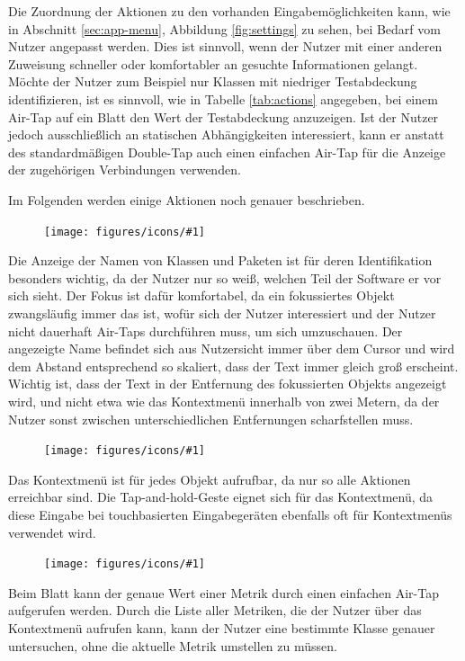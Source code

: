 Die Zuordnung der Aktionen zu den vorhanden Eingabemöglichkeiten kann, wie in Abschnitt \ref{sec:app-menu}, Abbildung \ref{fig:settings} zu sehen, bei Bedarf vom Nutzer angepasst werden. Dies ist sinnvoll, wenn der Nutzer mit einer anderen Zuweisung schneller oder komfortabler an gesuchte Informationen gelangt. Möchte der Nutzer zum Beispiel nur Klassen mit niedriger Testabdeckung identifizieren, ist es sinnvoll, wie in Tabelle \ref{tab:actions} angegeben, bei einem Air-Tap auf ein Blatt den Wert der Testabdeckung anzuzeigen. Ist der Nutzer jedoch ausschließlich an statischen Abhängigkeiten interessiert, kann er anstatt des standardmäßigen Double-Tap auch einen einfachen Air-Tap für die Anzeige der zugehörigen Verbindungen verwenden.

Im Folgenden werden einige Aktionen noch genauer beschrieben. \\

\newcommand{\inlineicon}[1]{
  \setlength\intextsep{0pt}
  \begin{figure}
    \vspace{-2px}
    \texttt{[image: figures/icons/\#1]}
  \end{figure}
}

\begingroup

\inlineicon{info}\noindent Die Anzeige der Namen von Klassen und Paketen ist für deren Identifikation besonders wichtig, da der Nutzer nur so weiß, welchen Teil der Software er vor sich sieht. Der Fokus ist dafür komfortabel, da ein fokussiertes Objekt zwangsläufig immer das ist, wofür sich der Nutzer interessiert und der Nutzer nicht dauerhaft Air-Taps durchführen muss, um sich umzuschauen. Der angezeigte Name befindet sich aus Nutzersicht immer über dem Cursor und wird dem Abstand entsprechend so skaliert, dass der Text immer gleich groß erscheint. Wichtig ist, dass der Text in der Entfernung des fokussierten Objekts angezeigt wird, und nicht etwa wie das Kontextmenü innerhalb von zwei Metern, da der Nutzer sonst zwischen unterschiedlichen Entfernungen scharfstellen muss.\\

\inlineicon{context-menu}\noindent Das Kontextmenü ist für jedes Objekt aufrufbar, da nur so alle Aktionen erreichbar sind. Die Tap-and-hold-Geste eignet sich für das Kontextmenü, da diese Eingabe bei touchbasierten Eingabegeräten ebenfalls oft für Kontextmenüs verwendet wird.\\

\inlineicon{metric}\noindent Beim Blatt kann der genaue Wert einer Metrik durch einen einfachen Air-Tap aufgerufen werden. Durch die Liste aller Metriken, die der Nutzer über das Kontextmenü aufrufen kann, kann der Nutzer eine bestimmte Klasse genauer untersuchen, ohne die aktuelle Metrik umstellen zu müssen.\\

